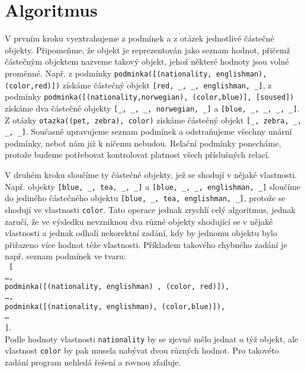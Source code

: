 \documentclass[11pt]{article} %
\begin{document}
\section{Algoritmus}
V prvním kroku vyextrahujeme z podmínek a z otázek jednotlivé částečné objekty. Připomeňme, že objekt je reprezentován jako seznam hodnot, přičemž částečným objektem nazveme takový objekt, jehož některé hodnoty jsou volné proměnné. Např. z podmínky \texttt{podminka([(nationality, englishman), (color,red)])} získáme částečný objekt \texttt{[red, \_, \_, englishman, \_]}, z pod\-mín\-ky \texttt{podminka([(nationality,norwegian), (color,blue)], [soused])} získáme dva čás\-teč\-né objekty \texttt{[\_, \_, \_, norwegian, \_]} a \texttt{[blue, \_, \_, \_, \_]}. Z otázky \texttt{otazka((pet, zebra), color)} získáme částečný objekt \texttt{[\_, zebra, \_, \_, \_]}. Současně upravujeme seznam podmínek a odstraňujeme všechny unární podmínky, neboť nám již k ničemu nebudou. Relační podmínky ponecháme, protože budeme potřebovat kontrolovat platnost všech příslušných relací.

V druhém kroku sloučíme ty částečné objekty, jež se shodují v nějaké vlastnosti. Např. objekty \texttt{[blue, \_, tea, \_, \_]} a \texttt{[blue, \_, \_, englishman, \_]} sloučíme do jediného částečného objektu \texttt{[blue, \_, tea, englishman, \_]}, protože se shodují ve vlastnosti \texttt{color}.  Tato operace jednak zrychlí celý algoritmus, jednak zaručí, že ve výsledku nevzniknou dva různé objekty shodující se v nějaké vlastnosti a jednak odhalí nekorektní zadání, kdy by jednomu objektu bylo přiřazeno více hodnot téže vlastnosti. Příkladem takového chybného zadání je např. seznam podmínek ve tvaru: \\ 
\texttt{ [\\
\ldots, \\
podminka([(nationality, englishman) , (color, red)]), \\ 
\ldots, \\ 
podminka([(nationality, englishman), (color,blue)]), \\ 
\ldots \\
]}. \\
Podle hodnoty vlastnosti \texttt{nationality} by se zjevně mělo jednat o týž objekt, ale vlastnost \texttt{color} by pak musela nabývat dvou různých hodnot. Pro takovéto zadání program nehledá řešení a rovnou zfailuje.
\end{document}
